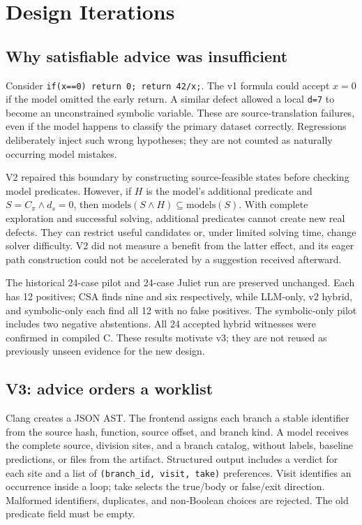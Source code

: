 \documentclass[sigconf]{acmart}
\begin{document}
\section{Design Iterations}
\subsection{Why satisfiable advice was insufficient}
Consider \texttt{if(x==0) return 0; return 42/x;}. The v1 formula could accept
$x=0$ if the model omitted the early return. A similar defect allowed a
local \texttt{d=7} to become an unconstrained symbolic variable. These are
source-translation failures, even if the model happens to classify the
primary dataset correctly. Regressions deliberately inject such wrong
hypotheses; they are not counted as naturally occurring model mistakes.

V2 repaired this boundary by constructing source-feasible states before
checking model predicates. However, if $H$ is the model's additional
predicate and $S=C_\pi\land d_s=0$, then
$\mathrm{models}(S\land H)\subseteq\mathrm{models}(S)$.
With complete exploration and successful solving, additional predicates
cannot create new real defects. They can restrict useful candidates or,
under limited solving time, change solver difficulty. V2 did not measure
a benefit from the latter effect, and its eager path construction could
not be accelerated by a suggestion received afterward.

The historical 24-case pilot and 24-case Juliet run are preserved unchanged.
Each has 12 positives; CSA finds nine and six respectively, while LLM-only,
v2 hybrid, and symbolic-only each find all 12 with no false positives.
The symbolic-only pilot includes two negative abstentions. All 24 accepted
hybrid witnesses were confirmed in compiled C. These results motivate v3;
they are not reused as previously unseen evidence for the new design.

\subsection{V3: advice orders a worklist}
Clang creates a JSON AST. The frontend assigns each branch a stable identifier
from the source hash, function, source offset, and branch kind. A model receives
the complete source, division sites, and a branch catalog, without labels,
baseline predictions, or files from the artifact. Structured output includes
a verdict for each site and a list of
\texttt{(branch\_id, visit, take)} preferences. Visit identifies an occurrence
inside a loop; take selects the true/body or false/exit direction.
Malformed identifiers, duplicates, and non-Boolean choices are rejected.
The old predicate field must be empty.
\end{document}
